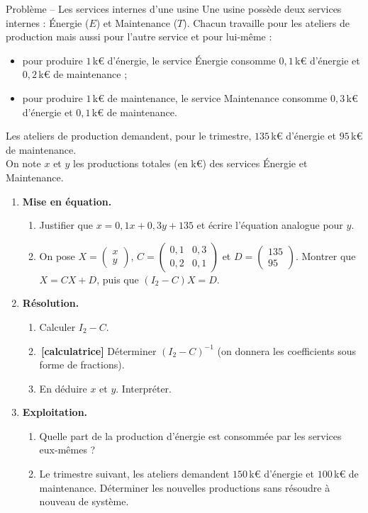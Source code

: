\documentclass[a4paper,11pt]{article}
\newcommand{\M}[1]{\begin{pmatrix}#1\end{pmatrix}}
\newcommand{\calc}{\,{\color{uimmred}\small\textbf{[calculatrice]}}}
\begin{document}
\begin{exo}{Problème -- Les services internes d'une usine}
\label{exo:pb}
Une usine possède deux services internes : Énergie ($E$) et Maintenance ($T$). Chacun travaille pour les ateliers de production mais aussi pour l'autre service et pour lui-même :
\begin{itemize}
  \item pour produire $1$\,k€ d'énergie, le service Énergie consomme $0{,}1$\,k€ d'énergie et $0{,}2$\,k€ de maintenance ;
  \item pour produire $1$\,k€ de maintenance, le service Maintenance consomme $0{,}3$\,k€ d'énergie et $0{,}1$\,k€ de maintenance.
\end{itemize}
Les ateliers de production demandent, pour le trimestre, $135$\,k€ d'énergie et $95$\,k€ de maintenance.\\
On note $x$ et $y$ les productions totales (en k€) des services Énergie et Maintenance.
\begin{enumerate}
  \item \textbf{Mise en équation.}
  \begin{enumerate}
    \item Justifier que $x = 0{,}1x + 0{,}3y + 135$ et écrire l'équation analogue pour $y$.
    \item On pose $X = \M{x\\y}$, $C = \M{0{,}1 & 0{,}3\\ 0{,}2 & 0{,}1}$ et $D = \M{135\\95}$. Montrer que $X = CX + D$, puis que $(I_2 - C)X = D$.
  \end{enumerate}
  \item \textbf{Résolution.}
  \begin{enumerate}
    \item Calculer $I_2 - C$.
    \item \calc{} Déterminer $(I_2 - C)^{-1}$ (on donnera les coefficients sous forme de fractions).
    \item En déduire $x$ et $y$. Interpréter.
  \end{enumerate}
  \item \textbf{Exploitation.}
  \begin{enumerate}
    \item Quelle part de la production d'énergie est consommée par les services eux-mêmes ?
    \item Le trimestre suivant, les ateliers demandent $150$\,k€ d'énergie et $100$\,k€ de maintenance. Déterminer les nouvelles productions sans résoudre à nouveau de système.
  \end{enumerate}
\end{enumerate}
\end{exo}
\end{document}
